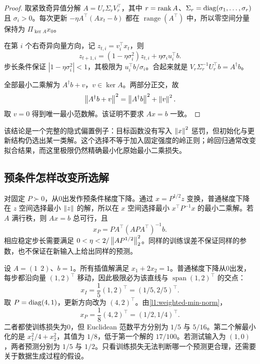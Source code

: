 \begin{proof}
取紧致奇异值分解 $A=U_r\Sigma_rV_r^\top$，其中 $r=\operatorname{rank} A$、$\Sigma_r=\operatorname{diag}(\sigma_1,\ldots,\sigma_r)$ 且 $\sigma_i>0$。每次更新 $-\eta A^\top(Ax_t-b)$ 都在 $\operatorname{range}(A^\top)$ 中，所以零空间分量保持为 $\Pi_{\ker A}x_0$。

在第 $i$ 个右奇异向量方向，记 $z_{t,i}=v_i^\top x_t$，则
\[
 z_{t+1,i}=(1-\eta\sigma_i^2)z_{t,i}
              +\eta\sigma_i u_i^\top b.
\]
步长条件保证 $|1-\eta\sigma_i^2|<1$，其极限为 $u_i^\top b/\sigma_i$。合起来就是 $V_r\Sigma_r^{-1}U_r^\top b=A^\dagger b$。

全部最小二乘解为 $A^\dagger b+v$，$v\in\ker A$。两部分正交，故
\[
 \left\lVert A^\dagger b+v\right\rVert^2=\left\lVert A^\dagger b\right\rVert^2+\left\lVert v\right\rVert^2.
\]
取 $v=0$ 得到唯一最小范数解。该证明不要求 $Ax=b$ 一致。
\end{proof}

该结论是一个完整的隐式偏置例子：目标函数没有写入 $\left\lVert x\right\rVert^2$ 惩罚，但初始化与更新结构仍选出某一类解。这个选择不等于加入固定强度的岭正则；岭回归通常改变拟合结果，而这里极限仍然精确最小化原始最小二乘损失。

\subsection{预条件怎样改变所选解}

对固定 $P\succ0$，从0出发作预条件梯度下降。通过 $x=P^{1/2}z$ 变换，普通梯度下降在 $z$ 空间选择最小 $\left\lVert z\right\rVert$ 的解，所以在 $x$ 空间选择最小 $x^\top P^{-1}x$ 的最小二乘解。若 $A$ 满行秩，则 $Ax=b$ 总可行，且
\begin{equation}
 x_P=P A^\top(AP A^\top)^{-1}b.
 \label{l1:weighted-min-norm}
\end{equation}
相应稳定步长需要满足 $0<\eta<2/\left\lVert AP^{1/2}\right\rVert_2^2$。同样的训练误差不保证同样的参数，也不保证在新输入上给出同样的预测。

\begin{example}[同一条插值直线上的两种选择]
\label{l1:ex-min-norm}
设 $A=(1\ \ 2)$、$b=1$。所有插值解满足 $x_1+2x_2=1$。普通梯度下降从0出发，每步都沿向量 $(1,2)^\top$ 移动，因此极限必为该直线与 $\operatorname{span}(1,2)^\top$ 的交点：
\[
 x_I=\frac15(1,2)^\top=(1/5,2/5)^\top.
\]
取 $P=\operatorname{diag}(4,1)$，更新方向改为 $(4,2)^\top$。由\eqref{l1:weighted-min-norm}，
\[
 x_P=\frac18(4,2)^\top=(1/2,1/4)^\top.
\]
二者都使训练损失为0，但 Euclidean 范数平方分别为 $1/5$ 与 $5/16$。第二个解最小化的是 $x_1^2/4+x_2^2$，其值为 $1/8$，低于第一个解的 $17/100$。若测试输入为 $(1,0)$，两者预测分别为 $1/5$ 与 $1/2$。只看训练损失无法判断哪一个预测更合理，还需要关于数据生成过程的假设。
\end{example}

